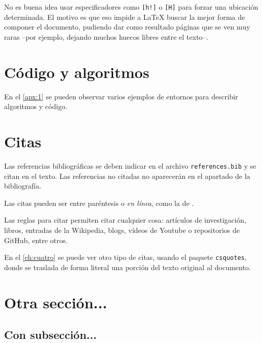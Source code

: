 No es buena idea usar especificadores como \texttt{[h!]} o \texttt{[H]} para forzar una ubicación determinada. El motivo es que eso impide a \LaTeX{} buscar la mejor forma de componer el documento, pudiendo dar como resultado páginas que se ven muy raras --por ejemplo, dejando muchos huecos libres entre el texto--.

\section{Código y algoritmos}

\noindent En el \autoref{apx:1} se pueden observar varios ejemplos de entornos para describir algoritmos y código.

\section{Citas}

\noindent Las referencias bibliográficas se deben indicar en el archivo \texttt{references.bib} y se citan en el texto. Las referencias no citadas no aparecerán en el apartado de la bibliografía.

Las citas pueden ser entre paréntesis \parencite{examplearticle} o \emph{en línea}, como la de \cite{examplegithub}.

Las  reglas para citar \parencite{ulllibguide} permiten citar cualquier cosa: artículos de investigación, libros, entradas de la Wikipedia, blogs, vídeos de Youtube o repositorios de GitHub, entre otros. 

En el \autoref{ch:cuatro} se puede ver otro tipo de citas, usando el paquete \texttt{csquotes}, donde se traslada de forma literal una porción del texto original al documento.
 
\section{Otra sección...}

\noindent \lipsum[1]

\subsection{Con subsección...}

\noindent \lipsum[2]